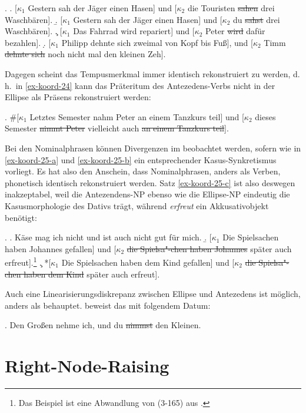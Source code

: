 \ex. 
\a. \label{ex-koord-23-a}[$\kappa_1$ Gestern sah der Jäger einen Hasen] und [$\kappa_2$ die Touristen \sout{sahen} drei Waschbären].
\b. \label{ex-koord-23-b}[$\kappa_1$ Gestern sah der Jäger einen Hasen] und [$\kappa_2$ du \sout{sahst} drei Waschbären]. 
\c. \label{ex-koord-23-c}[$\kappa_1$ Das Fahrrad wird repariert] und [$\kappa_2$ Peter \sout{wird} dafür bezahlen].
\d. \label{ex-koord-23-d}[$\kappa_1$ Philipp dehnte sich zweimal von Kopf bis Fuß], und [$\kappa_2$ Timm \sout{dehnte sich} noch nicht mal den kleinen Zeh].    

Dagegen scheint das Tempusmerkmal immer identisch rekonstruiert zu werden, d.\,h.\ in \ref{ex-koord-24} kann das Präteritum des Antezedens-Verbs nicht in der Ellipse als Präsens rekonstruiert werden:

\ex.  \#[$\kappa_1$ Letztes Semester nahm Peter an einem Tanzkurs teil] und [$\kappa_2$ dieses Semester \sout{nimmt Peter} vielleicht auch \sout{an einem Tanzkurs teil}].\label{ex-koord-24}

Bei den Nominalphrasen können Divergenzen im  beobachtet werden, sofern wie in \ref{ex-koord-25-a} und \ref{ex-koord-25-b} ein entsprechender Kasus-Synkretismus vorliegt. Es hat also den Anschein, dass Nominalphrasen, anders als Verben, phonetisch identisch rekonstruiert werden. Satz \ref{ex-koord-25-c} ist also deswegen inakzeptabel, weil die Antezendens-NP ebenso wie die Ellipse-NP eindeutig die Kasusmorphologie des Dativs trägt, während {\it erfreut} ein Akkusativobjekt benötigt:

\ex. \label{ex-koord-25}
\a. Käse mag ich nicht und ist auch nicht gut für mich. \hfill \citep[(36)]{Oirsouw:93}\label{ex-koord-25-a}
\b. [$\kappa_1$ Die Spielsachen haben Johannes gefallen] und [$\kappa_2$ \sout{die Spielsa"-chen haben Johannes} später auch erfreut].\footnote{Das Beispiel ist eine Abwandlung von (3-165) aus \cite{Hesse:Kuestner:85}. }\label{ex-koord-25-b} 
\c. *[$\kappa_1$ Die Spielsachen haben dem Kind gefallen] und [$\kappa_2$ \sout{die Spielsa"-chen haben dem Kind} später auch erfreut].\label{ex-koord-25-c} 

Auch eine Linearisierungsdiskrepanz zwischen Ellipse und Antezedens ist möglich, anders als \cite{Ross:70} behauptet. \cite{Oirsouw:87} beweist das mit folgendem Datum:

\ex. Den Gro\ss en nehme ich, und du \sout{nimmst} den Kleinen. \hfill \citep[262]{Oirsouw:87}


\newpage
\section{Right-Node-Raising}\label{sec-rnr}


